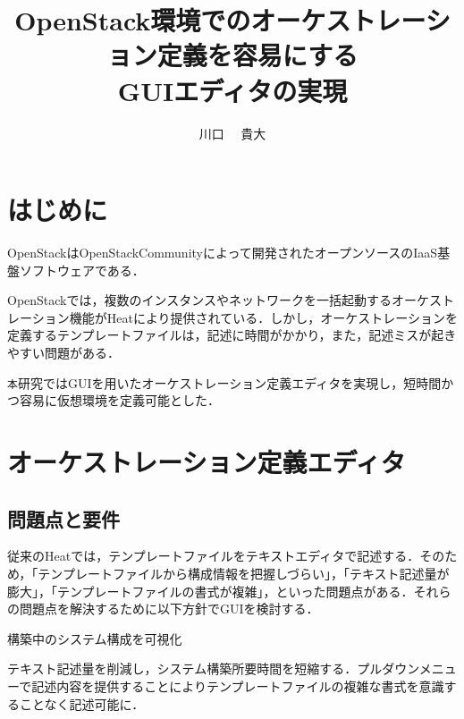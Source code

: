 \documentclass[a4j]{jarticle}
\title{OpenStack環境でのオーケストレーション定義を容易にする\\GUIエディタの実現}
\author{川口 ~~貴大}
\begin{document}
\begin{Abstract}
 
 \section{はじめに}
 OpenStackはOpenStackCommunityによって開発されたオープンソースのIaaS基盤ソフトウェアである．\cite{Document:1}
 
 OpenStackでは，複数のインスタンスやネットワークを一括起動するオーケストレーション機能がHeatにより提供されている．しかし，オーケストレーションを定義するテンプレートファイルは，記述に時間がかかり，また，記述ミスが起きやすい問題がある．
 
 \texttt 本研究ではGUIを用いたオーケストレーション定義エディタを実現し，短時間かつ容易に仮想環境を定義可能とした．
 \section{オーケストレーション定義エディタ}
 \subsection{問題点と要件}
 従来のHeatでは，テンプレートファイルをテキストエディタで記述する．そのため，「テンプレートファイルから構成情報を把握しづらい」，「テキスト記述量が膨大」，「テンプレートファイルの書式が複雑」，といった問題点がある．それらの問題点を解決するために以下方針でGUIを検討する．
 \begin{description}
 	\vspace{-2mm}
 	\item[(GUIを採用)]構築中のシステム構成を可視化
 	\vspace{-2mm}
 	\item[(手動入力を撤廃)]テキスト記述量を削減し，システム構築所要時間を短縮する．プルダウンメニューで記述内容を提供することによりテンプレートファイルの複雑な書式を意識することなく記述可能に．
 	\vspace{-2mm}
 \end{description}
 \vspace{-5mm}

\end{Abstract}
\end{document}
